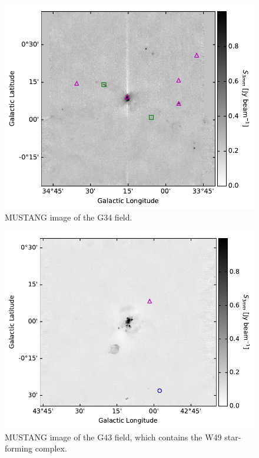 \documentclass[twocolumn]{aastex62}
\begin{document}
\begin{figure}[htp]
\includegraphics[width=17cm]{figures/G34_overview_withcatalog.pdf}
\caption{MUSTANG image of the G34 field.}
\label{fig:g34overview}
\end{figure}

\begin{figure}[htp]
\includegraphics[width=17cm]{figures/G43_overview_withcatalog.pdf}
\caption{MUSTANG image of the G43 field, which contains the 
W49 star-forming complex.}
\label{fig:g43overview}
\end{figure}
\end{document}
